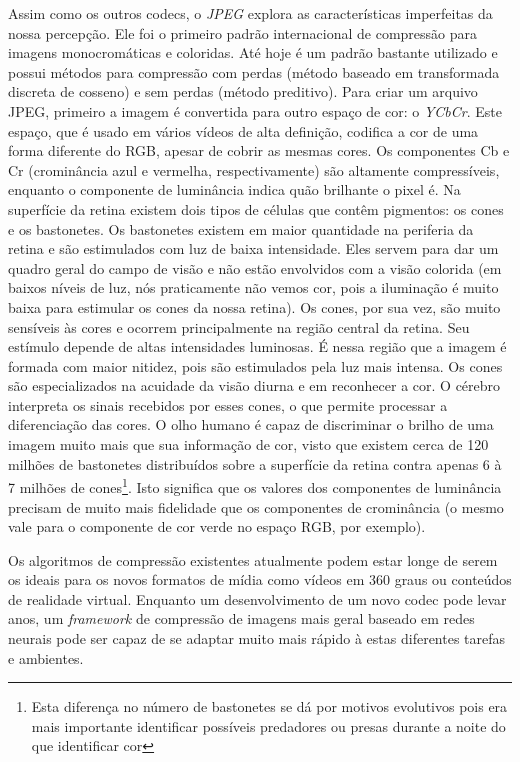 Assim como os outros codecs, o \textit{JPEG} explora as características imperfeitas da nossa percepção. Ele foi o primeiro padrão internacional de compressão para imagens monocromáticas e coloridas. Até hoje é um padrão bastante utilizado e possui métodos para compressão com perdas (método baseado em transformada discreta de cosseno) e sem perdas (método preditivo). Para criar um arquivo JPEG, primeiro a imagem é convertida para outro espaço de cor: o \textit{YCbCr}. Este espaço, que é usado em vários vídeos de alta definição, codifica a cor de uma forma diferente do RGB, apesar de cobrir as mesmas cores. Os componentes Cb e Cr (crominância azul e vermelha, respectivamente) são altamente compressíveis, enquanto o componente de luminância indica quão brilhante o pixel é. Na superfície da retina existem dois tipos de células que contêm pigmentos: os cones e os bastonetes. Os bastonetes existem em maior quantidade na periferia da retina e são estimulados com luz de baixa intensidade. Eles servem para dar um quadro geral do campo de visão e não estão envolvidos com a visão colorida (em baixos níveis de luz, nós praticamente não vemos cor, pois a iluminação é muito baixa para estimular os cones da nossa retina). Os cones, por sua vez, são muito sensíveis às cores e ocorrem principalmente na região central da retina. Seu estímulo depende de altas intensidades luminosas. É nessa região que a imagem é formada com maior nitidez, pois são estimulados pela luz mais intensa. Os cones são especializados na acuidade da visão diurna e em reconhecer a cor. O cérebro interpreta os sinais recebidos por esses cones, o que permite processar a diferenciação das cores. O olho humano é capaz de discriminar o brilho de uma imagem muito mais que sua informação de cor, visto que existem cerca de 120 milhões de bastonetes distribuídos sobre a superfície da retina contra apenas 6 à 7 milhões de cones\footnote{Esta diferença no número de bastonetes se dá por motivos evolutivos pois era mais importante identificar possíveis predadores ou presas durante a noite do que identificar cor}. Isto significa que os valores dos componentes de luminância precisam de muito mais fidelidade que os componentes de crominância (o mesmo vale para o componente de cor verde no espaço RGB, por exemplo).

Os algoritmos de compressão existentes atualmente podem estar longe de serem os ideais para os novos formatos de mídia como vídeos em 360 graus ou conteúdos de realidade virtual. Enquanto um desenvolvimento de um novo codec pode levar anos, um \textit{framework} de compressão de imagens mais geral baseado em redes neurais pode ser capaz de se adaptar muito mais rápido à estas diferentes tarefas e ambientes.

